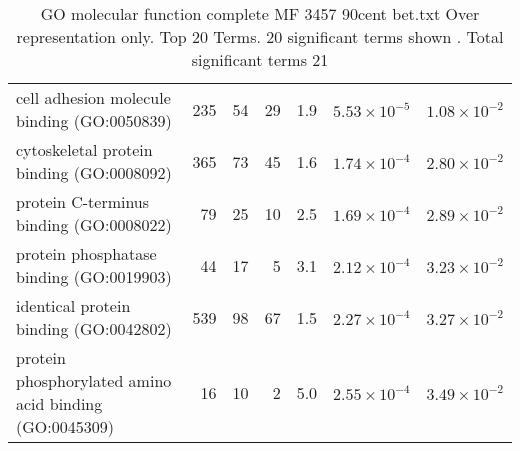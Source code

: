 \begin{table}[ht]
\begin{adjustbox}{width=\textwidth}
\begin{tabular}{lrrrrrr}
  cell adhesion molecule binding (GO:0050839) & 235 & 54 & 29 & 1.9 & $5.53 \times 10^{-5}$ & $1.08 \times 10^{-2}$ \\ 
  cytoskeletal protein binding (GO:0008092) & 365 & 73 & 45 & 1.6 & $1.74 \times 10^{-4}$ & $2.80 \times 10^{-2}$ \\ 
  protein C-terminus binding (GO:0008022) & 79 & 25 & 10 & 2.5 & $1.69 \times 10^{-4}$ & $2.89 \times 10^{-2}$ \\ 
  protein phosphatase binding (GO:0019903) & 44 & 17 & 5 & 3.1 & $2.12 \times 10^{-4}$ & $3.23 \times 10^{-2}$ \\ 
  identical protein binding (GO:0042802) & 539 & 98 & 67 & 1.5 & $2.27 \times 10^{-4}$ & $3.27 \times 10^{-2}$ \\ 
  protein phosphorylated amino acid binding (GO:0045309) & 16 & 10 & 2 & 5.0 & $2.55 \times 10^{-4}$ & $3.49 \times 10^{-2}$ \\ 
   \hline
\end{tabular}
\end{adjustbox}
\caption{GO molecular function complete MF 3457 90cent bet.txt Over representation only. Top 20 Terms. 20 significant terms shown . Total significant terms 21} 
\label{tab:GO molecular function complete MF 3457 90cent bet.txt Over representation only. Top 20 Terms. 20 significant terms shown . Total significant terms 21}
\end{table}


